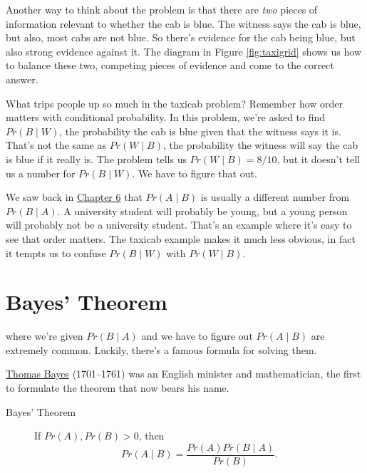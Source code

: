 \documentclass[justified]{tufte-book}
\newcommand{\given}{\mid}
\newcommand{\p}{Pr}
\theoremstyle{definition}
\theoremstyle{definition}
\theoremstyle{definition}
\theoremstyle{remark}
\begin{document}
Another way to think about the problem is that there are \emph{two}
pieces of information relevant to whether the cab is blue. The witness
says the cab is blue, but also, most cabs are not blue. So there's
evidence for the cab being blue, but also strong evidence against it.
The diagram in Figure \ref{fig:taxigrid} shows us how to balance these
two, competing pieces of evidence and come to the correct answer.

What trips people up so much in the taxicab problem? Remember how order
matters with conditional probability. In this problem, we're asked to
find \(\p(B \given W)\), the probability the cab is blue given that the
witness says it is. That's not the same as \(\p(W \given B)\), the
probability the witness will say the cab is blue if it really is. The
problem tells us \(\p(W \given B) = 8/10\), but it doesn't tell us a
number for \(\p(B \given W)\). We have to figure that out.

We saw back in \protect\hyperlink{conditional-probability}{Chapter 6}
that \(\p(A \given B)\) is usually a different number from
\(\p(B \given A)\). A university student will probably be young, but a
young person will probably not be a university student. That's an
example where it's easy to see that order matters. The taxicab example
makes it much less obvious, in fact it tempts us to confuse
\(\p(B \given W)\) with \(\p(W \given B)\).

\hypertarget{bayes-theorem}{%
\section{Bayes' Theorem}\label{bayes-theorem}}

 where we're given \(\p(B \given A)\) and we have
to figure out \(\p(A \given B)\) are extremely common. Luckily, there's
a famous formula for solving them.

\begin{marginfigure}
\href{https://en.wikipedia.org/wiki/Thomas_Bayes}{Thomas Bayes}
(1701--1761) was an English minister and mathematician, the first to
formulate the theorem that now bears his name.
\end{marginfigure}

\begin{description}
\item[Bayes' Theorem]
If \(\p(A),\p(B)>0\), then
\[ \p(A \given B) = \frac{\p(A)\p(B \given A)}{\p(B)}. \]
\end{description}
\end{document}
